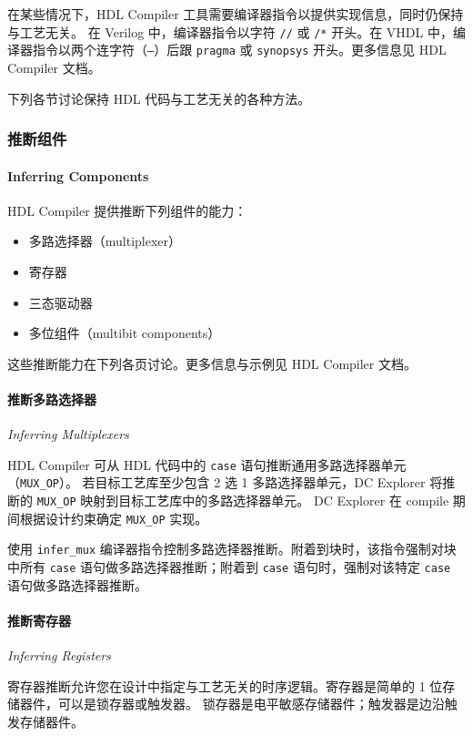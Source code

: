 在某些情况下，HDL Compiler 工具需要编译器指令以提供实现信息，同时仍保持与工艺无关。
在 Verilog 中，编译器指令以字符 \texttt{//} 或 \texttt{/*} 开头。在 VHDL 中，编译器指令以两个连字符（\texttt{--}）后跟 \texttt{pragma} 或 \texttt{synopsys} 开头。更多信息见 HDL Compiler 文档。

下列各节讨论保持 HDL 代码与工艺无关的各种方法。

\subsubsection{推断组件}
\paragraph*{Inferring Components}

HDL Compiler 提供推断下列组件的能力：
\begin{itemize}
  \item 多路选择器（multiplexer）
  \item 寄存器
  \item 三态驱动器
  \item 多位组件（multibit components）
\end{itemize}

这些推断能力在下列各页讨论。更多信息与示例见 HDL Compiler 文档。

\paragraph{推断多路选择器}
\textit{Inferring Multiplexers}

HDL Compiler 可从 HDL 代码中的 \texttt{case} 语句推断通用多路选择器单元（\texttt{MUX\_OP}）。
若目标工艺库至少包含 2 选 1 多路选择器单元，DC Explorer 将推断的 \texttt{MUX\_OP} 映射到目标工艺库中的多路选择器单元。
DC Explorer 在 compile 期间根据设计约束确定 \texttt{MUX\_OP} 实现。

使用 \texttt{infer\_mux} 编译器指令控制多路选择器推断。附着到块时，该指令强制对块中所有 \texttt{case} 语句做多路选择器推断；附着到 \texttt{case} 语句时，强制对该特定 \texttt{case} 语句做多路选择器推断。

\paragraph{推断寄存器}
\textit{Inferring Registers}

寄存器推断允许您在设计中指定与工艺无关的时序逻辑。寄存器是简单的 1 位存储器件，可以是锁存器或触发器。
锁存器是电平敏感存储器件；触发器是边沿触发存储器件。

